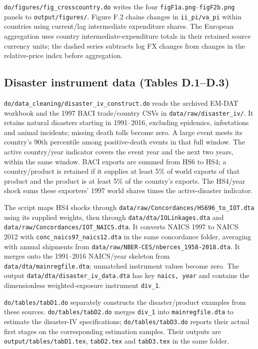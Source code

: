\documentclass[11pt]{article}
\newcommand{\pkgfile}[1]{\nolinkurl{#1}}
\begin{document}
\pkgfile{do/figures/fig_crosscountry.do} writes the four
\pkgfile{figF1a.png}--\pkgfile{figF2b.png} panels to
\pkgfile{output/figures/}. Figure F.2 chains changes in
\texttt{ii\_pi/va\_pi} within countries using current/lag intermediate
expenditure shares. The European aggregation uses
country intermediate-expenditure totals in their retained source currency
units; the dashed series subtracts log FX changes from changes in the
relative-price index before aggregation.

\subsection{Disaster instrument data (Tables D.1--D.3)}

\pkgfile{do/data_cleaning/disaster_iv_construct.do} reads the archived
EM-DAT workbook and the 1997 BACI trade/country CSVs in
\pkgfile{data/raw/disaster_iv/}. It retains natural disasters starting in
1991--2016, excluding epidemics, infestations and animal incidents;
missing death tolls become zero. A large event meets its country's 90th
percentile among positive-death events in that full window. The active
country/year indicator covers the event year and the next two years,
within the same window. BACI exports are summed from HS6 to HS4; a
country/product is retained if it supplies at least 5\% of world exports
of that product and the product is at least 5\% of the country's exports.
The HS4/year shock sums these exporters' 1997 world shares times the
active-disaster indicator.

The script maps HS4 shocks through
\pkgfile{data/raw/Concordances/HS696_to_IOT.dta} using its supplied weights,
then through \pkgfile{data/dta/IOLinkages.dta} and
\pkgfile{data/raw/Concordances/IOT_NAICS.dta}. It converts NAICS 1997 to
NAICS 2012 with \pkgfile{conc_naics97_naics12.dta} in the same concordance
folder, averaging with annual shipments from
\pkgfile{data/raw/NBER-CES/nberces_1958-2018.dta}. It merges onto the
1991--2016 NAICS/year skeleton from \pkgfile{data/dta/mainregfile.dta};
unmatched instrument values become zero. The output
\pkgfile{data/dta/disaster_iv_data.dta} has key \texttt{naics, year} and
contains the dimensionless weighted-exposure instrument \texttt{div\_1}.

\pkgfile{do/tables/tabD1.do} separately constructs the disaster/product
examples from these sources. \pkgfile{do/tables/tabD2.do} merges
\texttt{div\_1} into \pkgfile{mainregfile.dta} to estimate the disaster-IV
specifications; \pkgfile{do/tables/tabD3.do} reports their actual first
stages on the corresponding estimation samples. Their outputs are
\pkgfile{output/tables/tabD1.tex}, \pkgfile{tabD2.tex} and
\pkgfile{tabD3.tex} in the same folder.
\end{document}
